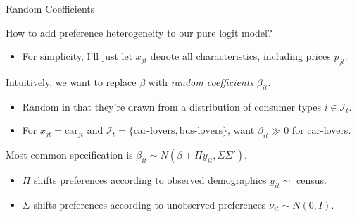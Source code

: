 \documentclass[aspectratio=169,t,11pt,table]{beamer}
\begin{document}
\begin{frame}{Random Coefficients}
    \vspace{-\baselineskip}
    \begin{minipage}[c][4\baselineskip][c]{\textwidth}
    \end{minipage}
    \vspace{-0.5\baselineskip}
    \begin{wideitemize}
        \item How to add preference heterogeneity to our pure logit model?
        \begin{itemize}
            \item For simplicity, I'll just let $x_{jt}$ denote all characteristics, including prices $p_{jt}$.
        \end{itemize}
        \pause
        \item Intuitively, we want to replace $\beta$ with \textit{random coefficients} \alert{$\beta_{it}$}.
        \begin{itemize}
            \item Random in that they're drawn from a distribution of consumer types $i \in \mathcal{I}_t$.
            \item For $x_{jt} = \text{car}_{jt}$ and $\mathcal{I}_t = \{\text{car-lovers}, \text{bus-lovers}\}$, want $\beta_{it} \gg 0$ for car-lovers.
        \end{itemize}
        \pause
        \item Most common specification is $\beta_{it} \sim N(\beta + \Pi y_{it}, \Sigma\Sigma')$.
        \begin{itemize}
            \item $\Pi$ shifts preferences according to observed demographics $y_{it} \sim $ census.
            \item $\Sigma$ shifts preferences according to unobserved preferences $\nu_{it} \sim N(0, I)$.
        \end{itemize}
    \end{wideitemize}
\end{frame}
\end{document}
